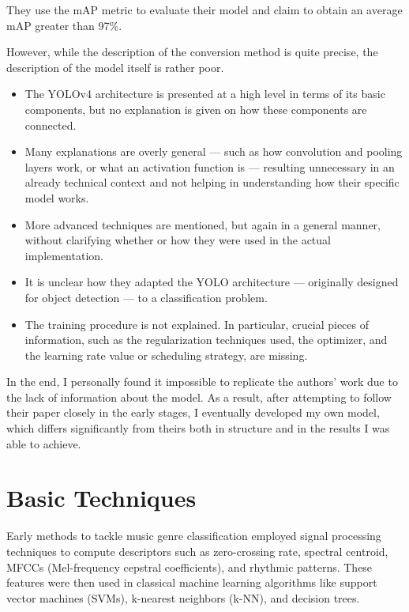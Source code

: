 \documentclass[a4paper,12pt]{article}
\begin{document}
They use the mAP metric to evaluate their model and claim to obtain an average mAP greater than 97\%.

However, while the description of the conversion method is quite precise, the description of the model itself is rather poor.
\begin{itemize}
	\item The YOLOv4 architecture is presented at a high level in terms of its basic components, but no explanation is given on how these components are connected.
    \item Many explanations are overly general — such as how convolution and pooling layers work, or what an activation function is — resulting unnecessary in an already technical context and not helping in understanding how their specific model works.
	\item More advanced techniques are mentioned, but again in a general manner, without clarifying whether or how they were used in the actual implementation.
	\item It is unclear how they adapted the YOLO architecture — originally designed for object detection — to a classification problem.
	\item The training procedure is not explained. In particular, crucial pieces of information, such as the regularization techniques used, the optimizer, and the learning rate value or scheduling strategy, are missing.
\end{itemize}

In the end, I personally found it impossible to replicate the authors' work due to the lack of information about the model. As a result, after attempting to follow their paper closely in the early stages, I eventually developed my own model, which differs significantly from theirs both in structure and in the results I was able to achieve.





\section{Basic Techniques}
Early methods to tackle music genre classification employed signal processing techniques to compute descriptors such as zero-crossing rate, spectral centroid, MFCCs (Mel-frequency cepstral coefficients), and rhythmic patterns. These features were then used in classical machine learning algorithms like support vector machines (SVMs), k-nearest neighbors (k-NN), and decision trees.
\end{document}
